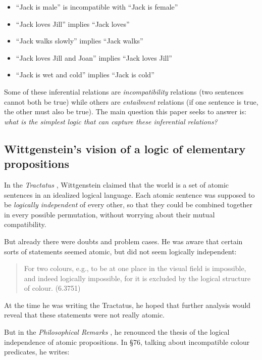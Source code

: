 \begin{itemize}

\item ``Jack is male'' is incompatible with ``Jack is female''
\item ``Jack loves Jill'' implies ``Jack loves''
\item ``Jack walks slowly'' implies ``Jack walks''
\item ``Jack loves Jill and Joan'' implies ``Jack loves Jill''
\item ``Jack is wet and cold'' implies ``Jack is cold''

\end{itemize}

\NI Some of these inferential relations are \emph{incompatibility}
relations (two sentences cannot both be true) while others are
\emph{entailment} relations (if one sentence is true, the other must
also be true).  The main question this paper seeks to answer is:
\emph{what is the simplest logic that can capture these inferential
  relations?}

\subsection{Wittgenstein's vision of a logic of elementary propositions}

\NI In the \emph{Tractatus} \cite{wittgenstein-tractatus}, Wittgenstein
claimed that the world is a set of atomic sentences in an idealized
logical language.  Each atomic sentence was supposed to be
\emph{logically independent} of every other, so that they could be
combined together in every possible permutation, without worrying
about their mutual compatibility.

But already there were doubts and problem cases.  He was aware that
certain sorts of statements seemed atomic, but did not seem logically
independent:

\begin{quote}
  For two colours, e.g., to be at one place in the visual field is
  impossible, and indeed logically impossible, for it is excluded by
  the logical structure of colour. (6.3751)
\end{quote}

\NI At the time he was writing the Tractatus, he hoped that further
analysis would reveal that these statements were not really atomic.

But in the \emph{Philosophical Remarks} \cite{wittgenstein-remarks}, he
renounced the thesis of the logical independence of atomic
propositions.  In \S 76, talking about incompatible colour predicates,
he writes:


